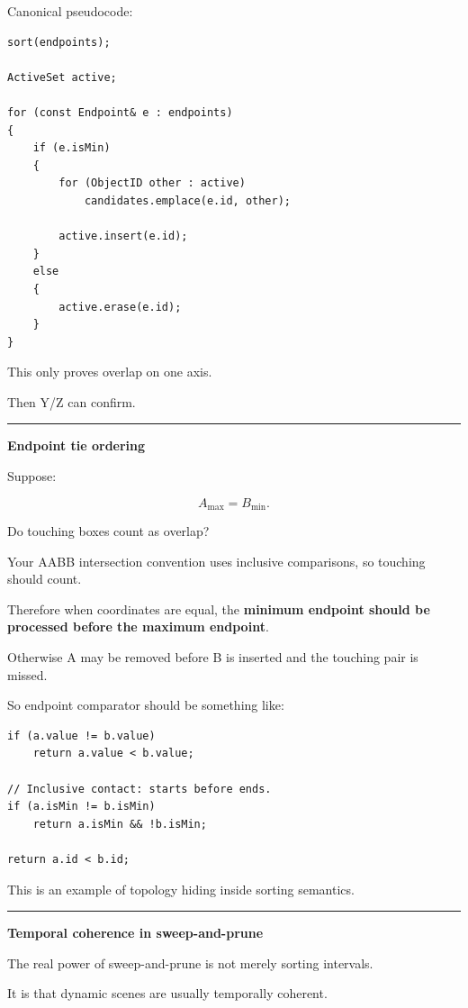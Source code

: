 Canonical pseudocode:

\begin{verbatim}
sort(endpoints);

ActiveSet active;

for (const Endpoint& e : endpoints)
{
    if (e.isMin)
    {
        for (ObjectID other : active)
            candidates.emplace(e.id, other);

        active.insert(e.id);
    }
    else
    {
        active.erase(e.id);
    }
}
\end{verbatim}

This only proves overlap on one axis.

Then Y/Z can confirm.

\begin{center}\rule{0.5\linewidth}{0.5pt}\end{center}

\textbf{Endpoint tie ordering}

Suppose:

\[
A_{\max}=B_{\min}.
\]

Do touching boxes count as overlap?

Your AABB intersection convention uses inclusive comparisons, so touching should count.

Therefore when coordinates are equal, the \textbf{minimum endpoint should be processed before the maximum endpoint}.

Otherwise A may be removed before B is inserted and the touching pair is missed.

So endpoint comparator should be something like:

\begin{verbatim}
if (a.value != b.value)
    return a.value < b.value;

// Inclusive contact: starts before ends.
if (a.isMin != b.isMin)
    return a.isMin && !b.isMin;

return a.id < b.id;
\end{verbatim}

This is an example of topology hiding inside sorting semantics.

\begin{center}\rule{0.5\linewidth}{0.5pt}\end{center}

\textbf{Temporal coherence in sweep-and-prune}

The real power of sweep-and-prune is not merely sorting intervals.

It is that dynamic scenes are usually temporally coherent.

